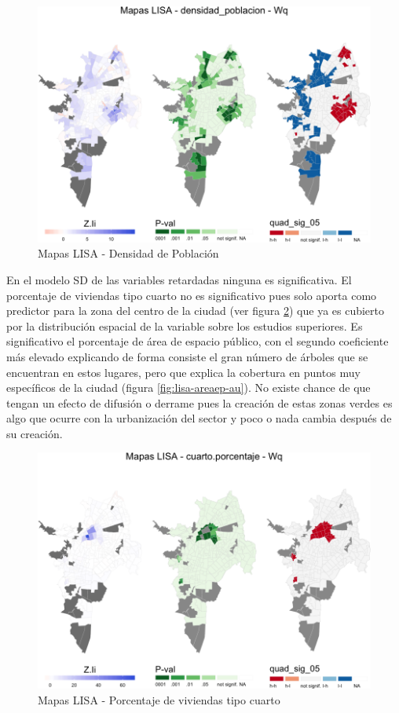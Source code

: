 \documentclass[12pt,]{book}
\begin{document}
\begin{figure}
\includegraphics[width=1\linewidth]{tesis-unigis_files/figure-latex/lisa-densidadpob-1} \caption{Mapas LISA - Densidad de Población}\label{fig:lisa-densidadpob}
\end{figure}

En el modelo SD de las variables retardadas ninguna es significativa. El
porcentaje de viviendas tipo cuarto no es significativo pues solo aporta
como predictor para la zona del centro de la ciudad (ver figura
\ref{fig:lisa-cuarto}) que ya es cubierto por la distribución espacial
de la variable sobre los estudios superiores. Es significativo el
porcentaje de área de espacio público, con el segundo coeficiente más
elevado explicando de forma consiste el gran número de árboles que se
encuentran en estos lugares, pero que explica la cobertura en puntos muy
específicos de la ciudad (figura \ref{fig:lisa-areaep-au}). No existe
chance de que tengan un efecto de difusión o derrame pues la creación de
estas zonas verdes es algo que ocurre con la urbanización del sector y
poco o nada cambia después de su creación.

\begin{figure}
\includegraphics[width=1\linewidth]{tesis-unigis_files/figure-latex/lisa-cuarto-1} \caption{Mapas LISA - Porcentaje de viviendas tipo cuarto}\label{fig:lisa-cuarto}
\end{figure}
\end{document}
